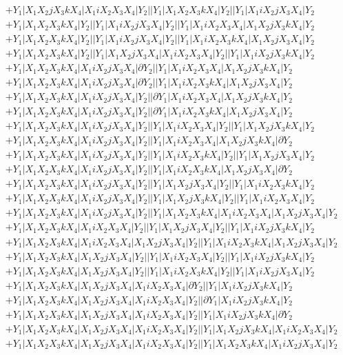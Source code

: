 \documentclass{article}[12pt]
\begin{document}
\begin{align*}
 & +Y_1|X_1X_2jX_3kX_4|X_1iX_2X_3X_4|Y_2||Y_1|X_1X_2X_3kX_4|Y_2||Y_1|X_1iX_2jX_3X_4|Y_2\\ 
 & +Y_1|X_1X_2X_3kX_4|Y_2||Y_1|X_1iX_2jX_3X_4|Y_2||Y_1|X_1iX_2X_3X_4|X_1X_2jX_3kX_4|Y_2\\ 
 & +Y_1|X_1X_2X_3kX_4|Y_2||Y_1|X_1iX_2jX_3X_4|Y_2||Y_1|X_1iX_2X_3kX_4|X_1X_2jX_3X_4|Y_2\\ 
 & +Y_1|X_1X_2X_3kX_4|Y_2||Y_1|X_1X_2jX_3X_4|X_1iX_2X_3X_4|Y_2||Y_1|X_1iX_2jX_3kX_4|Y_2\\ 
 & +Y_1|X_1X_2X_3kX_4|X_1iX_2jX_3X_4|\partial Y_2||Y_1|X_1iX_2X_3X_4|X_1X_2jX_3kX_4|Y_2\\ 
 & +Y_1|X_1X_2X_3kX_4|X_1iX_2jX_3X_4|\partial Y_2||Y_1|X_1iX_2X_3kX_4|X_1X_2jX_3X_4|Y_2\\ 
 & +Y_1|X_1X_2X_3kX_4|X_1iX_2jX_3X_4|Y_2||\partial Y_1|X_1iX_2X_3X_4|X_1X_2jX_3kX_4|Y_2\\ 
 & +Y_1|X_1X_2X_3kX_4|X_1iX_2jX_3X_4|Y_2||\partial Y_1|X_1iX_2X_3kX_4|X_1X_2jX_3X_4|Y_2\\ 
 & +Y_1|X_1X_2X_3kX_4|X_1iX_2jX_3X_4|Y_2||Y_1|X_1iX_2X_3X_4|Y_2||Y_1|X_1X_2jX_3kX_4|Y_2\\ 
 & +Y_1|X_1X_2X_3kX_4|X_1iX_2jX_3X_4|Y_2||Y_1|X_1iX_2X_3X_4|X_1X_2jX_3kX_4|\partial Y_2\\ 
 & +Y_1|X_1X_2X_3kX_4|X_1iX_2jX_3X_4|Y_2||Y_1|X_1iX_2X_3kX_4|Y_2||Y_1|X_1X_2jX_3X_4|Y_2\\ 
 & +Y_1|X_1X_2X_3kX_4|X_1iX_2jX_3X_4|Y_2||Y_1|X_1iX_2X_3kX_4|X_1X_2jX_3X_4|\partial Y_2\\ 
 & +Y_1|X_1X_2X_3kX_4|X_1iX_2jX_3X_4|Y_2||Y_1|X_1X_2jX_3X_4|Y_2||Y_1|X_1iX_2X_3kX_4|Y_2\\ 
 & +Y_1|X_1X_2X_3kX_4|X_1iX_2jX_3X_4|Y_2||Y_1|X_1X_2jX_3kX_4|Y_2||Y_1|X_1iX_2X_3X_4|Y_2\\ 
 & +Y_1|X_1X_2X_3kX_4|X_1iX_2jX_3X_4|Y_2||Y_1|X_1X_2X_3kX_4|X_1iX_2X_3X_4|X_1X_2jX_3X_4|Y_2\\ 
 & +Y_1|X_1X_2X_3kX_4|X_1iX_2X_3X_4|Y_2||Y_1|X_1X_2jX_3X_4|Y_2||Y_1|X_1iX_2jX_3kX_4|Y_2\\ 
 & +Y_1|X_1X_2X_3kX_4|X_1iX_2X_3X_4|X_1X_2jX_3X_4|Y_2||Y_1|X_1iX_2X_3kX_4|X_1X_2jX_3X_4|Y_2\\ 
 & +Y_1|X_1X_2X_3kX_4|X_1X_2jX_3X_4|Y_2||Y_1|X_1iX_2X_3X_4|Y_2||Y_1|X_1iX_2jX_3kX_4|Y_2\\ 
 & +Y_1|X_1X_2X_3kX_4|X_1X_2jX_3X_4|Y_2||Y_1|X_1iX_2X_3kX_4|Y_2||Y_1|X_1iX_2jX_3X_4|Y_2\\ 
 & +Y_1|X_1X_2X_3kX_4|X_1X_2jX_3X_4|X_1iX_2X_3X_4|\partial Y_2||Y_1|X_1iX_2jX_3kX_4|Y_2\\ 
 & +Y_1|X_1X_2X_3kX_4|X_1X_2jX_3X_4|X_1iX_2X_3X_4|Y_2||\partial Y_1|X_1iX_2jX_3kX_4|Y_2\\ 
 & +Y_1|X_1X_2X_3kX_4|X_1X_2jX_3X_4|X_1iX_2X_3X_4|Y_2||Y_1|X_1iX_2jX_3kX_4|\partial Y_2\\ 
 & +Y_1|X_1X_2X_3kX_4|X_1X_2jX_3X_4|X_1iX_2X_3X_4|Y_2||Y_1|X_1X_2jX_3kX_4|X_1iX_2X_3X_4|Y_2\\ 
 & +Y_1|X_1X_2X_3kX_4|X_1X_2jX_3X_4|X_1iX_2X_3X_4|Y_2||Y_1|X_1X_2X_3kX_4|X_1iX_2jX_3X_4|Y_2\end{align*}
\end{document}
